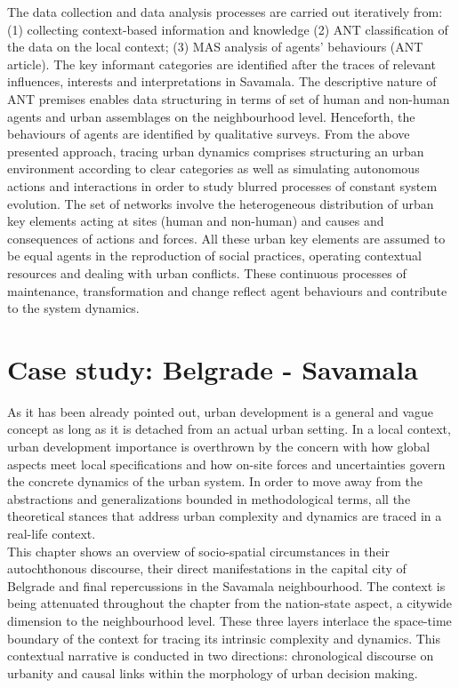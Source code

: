 \documentclass[11pt]{report}
\begin{document}
The data collection and data analysis processes are carried out iteratively from: (1) collecting context-based information and knowledge (2) ANT classification of the data on the local context; (3) MAS analysis of agents’ behaviours (ANT article). The key informant categories are identified after the traces of relevant influences, interests and interpretations in Savamala. The descriptive nature of ANT premises enables data structuring in terms of set of human and non-human agents and urban assemblages on the neighbourhood level. Henceforth, the behaviours of agents are identified by qualitative surveys.
From the above presented approach, tracing urban dynamics comprises structuring an urban environment according to clear categories as well as simulating autonomous actions and interactions in order to study blurred processes of constant system evolution. The set of networks involve the heterogeneous distribution of urban key elements acting at sites (human and non-human) and causes and consequences of actions and forces. All these urban key elements are assumed to be equal agents in the reproduction of social practices, operating contextual resources and dealing with urban conflicts. These continuous processes of maintenance, transformation and change reflect agent behaviours and contribute to the system dynamics.


\chapter{Case study: Belgrade - Savamala}

As it has been already pointed out, urban development is a general and vague concept as long as it is detached from an actual urban setting. In a local context, urban development importance is overthrown by the concern with how global aspects meet local specifications and how on-site forces and uncertainties govern the concrete dynamics of the urban system. In order to move away from the abstractions and generalizations bounded in methodological terms, all the theoretical stances that address urban complexity and dynamics are traced in a real-life context.
\\
This chapter shows an overview of socio-spatial circumstances in their autochthonous discourse, their direct manifestations in the capital city of Belgrade and final repercussions in the Savamala neighbourhood. The context is being attenuated throughout the chapter from the nation-state aspect, a citywide dimension to the neighbourhood level.
These three layers interlace the space-time boundary of the context for tracing its intrinsic complexity and dynamics.
This contextual narrative is conducted in two directions: chronological discourse on urbanity and causal links within the morphology of urban decision making. 
\end{document}
